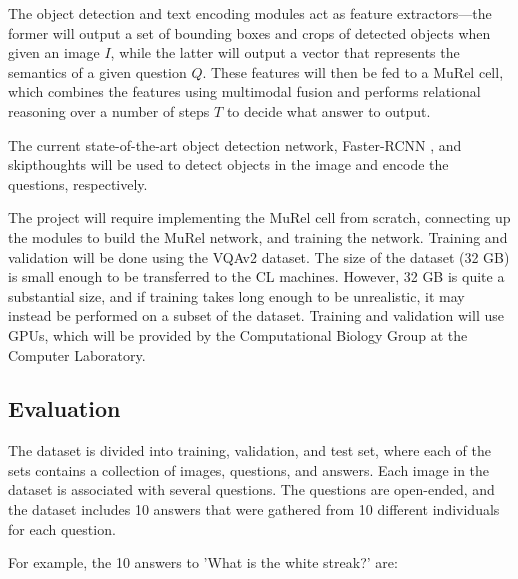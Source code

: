 \documentclass[12pt]{article}
\begin{document}
The object detection and text encoding modules act as feature extractors---the former will output a set of bounding boxes and crops of detected objects when given an image $I$, while the latter will output a vector that represents the semantics of a given question $Q$. These features will then be fed to a MuRel cell, which combines the features using multimodal fusion and performs relational reasoning over a number of steps $T$ to decide what answer to output. 

The current state-of-the-art object detection network, Faster-RCNN \cite{fasterrcnn}, and skipthoughts \cite{skipthoughts} will be used to detect objects in the image and encode the questions, respectively.

The project will require implementing the MuRel cell from scratch, connecting up the modules to build the MuRel network, and training the network. Training and validation will be done using the VQAv2 dataset. The size of the dataset (32 GB) is small enough to be transferred to the CL machines. However, 32 GB is quite a substantial size, and if training takes long enough to be unrealistic, it may instead be performed on a subset of the dataset. Training and validation will use GPUs, which will be provided by the Computational Biology Group at the Computer Laboratory.

\newpage

\subsection*{Evaluation}
The dataset is divided into training, validation, and test set, where each of the sets contains a collection of images, questions, and answers. Each image in the dataset is associated with several questions. The questions are open-ended, and the dataset includes 10 answers that were gathered from 10 different individuals for each question. 

For example, the 10 answers to 'What is the white streak?' are:
\end{document}

